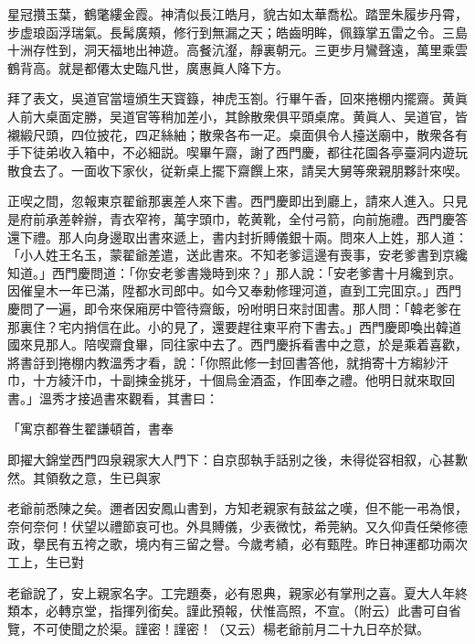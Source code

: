 \begin{myquote}
星冠攢玉葉，鶴氅縷金霞。神清似長江皓月，貌古如太華喬松。踏罡朱履步丹霄，步虚琅函浮瑞氣。長髯廣頰，修行到無漏之天；皓齒明眸，佩籙掌五雷之令。三島十洲存性到，洞天福地出神遊。高餐沆瀣，靜裏朝元。三更步月鸞聲遠，萬里乘雲鶴背高。就是都僊太史臨凡世，廣惠眞人降下方。
\end{myquote}

拜了表文，吳道官當壇頒生天寳籙，神虎玉劄。行畢午香，回來捲棚内擺齋。黄眞人前大桌面定勝，吴道官等稍加差小，其餘散衆俱平頭桌席。黄眞人、吴道官，皆襯緞尺頭，四位披花，四疋絲紬；散衆各布一疋。桌面俱令人擡送廟中，散衆各有手下徒弟收入箱中，不必細説。喫畢午齋，謝了西門慶，都往花園各亭臺洞内遊玩散食去了。一面收下家伙，従新桌上擺下齋饌上來，請吴大舅等衆親朋夥計來喫。

正喫之間，忽報東京翟爺那裏差人來下書。西門慶即出到廳上，請來人進入。只見是府前承差幹辦，青衣窄袴，萬字頭巾，乾黄靴，全付弓箭，向前施禮。西門慶答還下禮。那人向身邊取出書來遞上，書内封折賻儀銀十兩。問來人上姓，那人道：「小人姓王名玉，蒙翟爺差遣，送此書來。不知老爹這邊有喪事，安老爹書到京纔知道。」西門慶問道：「你安老爹書幾時到來？」那人說：「安老爹書十月纔到京。因催皇木一年已滿，陞都水司郎中。如今又奉勅修理河道，直到工完囬京。」西門慶問了一遍，即令來保廂房中管待齋飯，吩咐明日來討囬書。那人問：「韓老爹在那裏住？宅内捎信在此。小的見了，還要趕往東平府下書去。」西門慶即喚出韓道國來見那人。陪喫齋食畢，同往家中去了。西門慶拆看書中之意，於是乘着喜歡，將書㧱到捲棚内教溫秀才看，說：「你照此修一封回書答他，就捎寄十方縐紗汗巾，十方綾汗巾，十副揀金挑牙，十個烏金酒盃，作囬奉之禮。他明日就來取回書。」溫秀才接過書來觀看，其書曰：

\begin{myquote}[\markfont]
\hspace*{4em}「寓京都眷生翟謙頓首，書奉

即擢大錦堂西門四泉親家大人門下：自京邸執手話别之後，未得從容相叙，心甚歉然。其領敎之意，生已與家

老爺前悉陳之矣。邇者因安鳳山書到，方知老親家有鼓盆之嘆，但不能一弔為恨，奈何奈何！伏望以禮節哀可也。外具賻儀，少表微忱，希莞納。又久仰貴任榮修德政，擧民有五袴之歌，境内有三留之譽。今歲考績，必有甄陞。昨日神運都功兩次工上，生已對

老爺說了，安上親家名字。工完題奏，必有恩典，親家必有掌刑之喜。夏大人年終類本，必轉京堂，指揮列銜矣。謹此預報，伏惟高照，不宣。{\kaishu（附云）}此書可自省覽，不可使聞之於渠。謹密！謹密！{\kaishu（又云）}楊老爺前月二十九日卒於獄。

\end{myquote}

